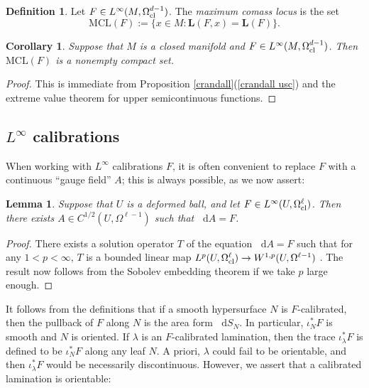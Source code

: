 \documentclass[reqno,11pt]{amsart}
\newcommand*\dif{\mathop{}\!\mathrm{d}}
\newcommand{\MCL}{\mathrm{MCL}}
\newcommand{\Comass}{\mathbf L}
\newcommand{\dfn}[1]{\emph{#1}\index{#1}}
\newtheorem{lemma}[theorem]{Lemma}
\newtheorem{corollary}[theorem]{Corollary}
\theoremstyle{definition}
\newtheorem{definition}[theorem]{Definition}
\numberwithin{equation}{section}
\begin{document}
\begin{definition}
Let $F \in L^\infty(M, \Omega^{d - 1}_{\rm cl})$.
The \dfn{maximum comass locus} is the set
$$\MCL(F) := \{x \in M: \Comass(F, x) = \Comass(F)\}.$$
\end{definition}

\begin{corollary}
Suppose that $M$ is a closed manifold and $F \in L^\infty(M, \Omega^{d - 1}_{\rm cl})$.
Then $\MCL(F)$ is a nonempty compact set.
\end{corollary}
\begin{proof}
This is immediate from Proposition \ref{crandall}(\ref{crandall usc}) and the extreme value theorem for upper semicontinuous functions.
\end{proof}

\subsection{\texorpdfstring{$L^\infty$}{L-infinity} calibrations}
When working with $L^\infty$ calibrations $F$, it is often convenient to replace $F$ with a continuous ``gauge field'' $A$; this is always possible, as we now assert:

\begin{lemma}\label{Hodge theorem}
Suppose that $U$ is a deformed ball, and let $F \in L^\infty(U, \Omega^\ell_{\rm cl})$.
Then there exists $A \in C^{1/2}(U, \Omega^{\ell - 1})$ such that $\dif A = F$.
\end{lemma}
\begin{proof}
There exists a solution operator $T$ of the equation $\dif A = F$ such that for any $1 < p < \infty$, $T$ is a bounded linear map $L^p(U, \Omega^\ell_{\rm cl}) \to W^{1, p}(U, \Omega^{\ell - 1})$ \cite{Costabel2010}.
The result now follows from the Sobolev embedding theorem if we take $p$ large enough.
\end{proof}

It follows from the definitions that if a smooth hypersurface $N$ is $F$-calibrated, then the pullback of $F$ along $N$ is the area form $\dif S_N$.
In particular, $\iota_N^* F$ is smooth and $N$ is oriented.
If $\lambda$ is an $F$-calibrated lamination, then the trace $\iota_\lambda^* F$ is defined to be $\iota_N^* F$ along any leaf $N$.
A priori, $\lambda$ could fail to be orientable, and then $\iota_\lambda^* F$ would be necessarily discontinuous.
However, we assert that a calibrated lamination is orientable:
\end{document}
